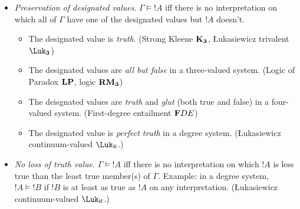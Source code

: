 \documentclass[../../../include/open-logic-section]{subfiles}
\begin{document}
\begin{itemize}
	\item \emph{Preservation of designated values}. $\Gamma \models !A$ iff there is no interpretation on which all of $\Gamma$ have one of the designated values but $!A$ doesn't. 
	\begin{itemize}
		\item The designated value is \emph{truth}. (Strong Kleene $\mathbf{K_3}$, Łukasiewicz trivalent $\Log{\Luk_3}$)
		\item The designated values are \emph{all but false} in a three-valued system. (Logic of Paradox $\mathbf{LP}$, logic $\mathbf{RM_3}$)
		\item The deisgnated values are \emph{truth} and \emph{glut} (both true and false) in a four-valued system. (First-degree entailment $\mathbf{F}DE$)
		\item The designated value is \emph{perfect truth} in a degree system. (Łukasiewicz continuum-valued $\Log{\Luk_\aleph}$.)
	\end{itemize}
	\item \emph{No loss of truth value}. $\Gamma \models !A$ iff there is no interpretation on which $!A$ is less true than the least true member(s) of $\Gamma$. Example: in a degree system, $!A \models !B$ if $!B$ is at least as true as $!A$ on any interpretation. (Łukasiewicz continuum-valued $\Log{\Luk_\aleph}$.)
\end{itemize}
\end{document}
